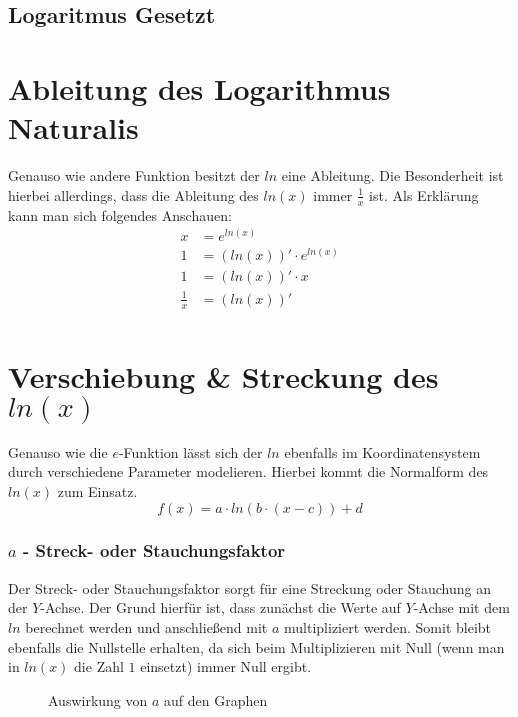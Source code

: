 \subsection{Logaritmus Gesetzt}
\pagebreak
\section{Ableitung des Logarithmus Naturalis}
Genauso wie andere Funktion besitzt der $ln$ eine Ableitung. Die Besonderheit ist hierbei allerdings, dass die Ableitung des $ln(x)$ immer $\frac{1}{x}$ ist. Als Erklärung kann man sich folgendes Anschauen:
\begin{align*}
	x&=e^{ln(x)}\tag{Ableiten auf beiden Seiten}\\
	1&=(ln(x))'\cdot e^{ln(x)}\tag{Beide Seiten vereinfachen}\\
	1&=(ln(x))'\cdot x\tag{Durch $x$ dividieren}\\
	\frac{1}{x}&=(ln(x))'\\	
\end{align*}
\pagebreak
\section{Verschiebung \& Streckung des $ln(x)$}
Genauso wie die $e$-Funktion lässt sich der $ln$ ebenfalls im Koordinatensystem durch verschiedene Parameter modelieren. Hierbei kommt die Normalform des $ln(x)$ zum Einsatz.
\[f(x)=a\cdot ln(b\cdot(x-c))+d\]
\subsubsection{$a$ - Streck- oder Stauchungsfaktor}
Der Streck- oder Stauchungsfaktor sorgt für eine Streckung oder Stauchung an der $Y$-Achse. Der Grund hierfür ist, dass zunächst die Werte auf $Y$-Achse mit dem $ln$ berechnet werden und anschließend mit $a$ multipliziert werden. Somit bleibt ebenfalls die Nullstelle erhalten, da sich beim Multiplizieren mit Null (wenn man in $ln(x)$ die Zahl $1$ einsetzt) immer Null ergibt. 
\begin{figure}[h]
\centering
	\caption{Auswirkung von $a$ auf den Graphen}
\end{figure}
\pagebreak
